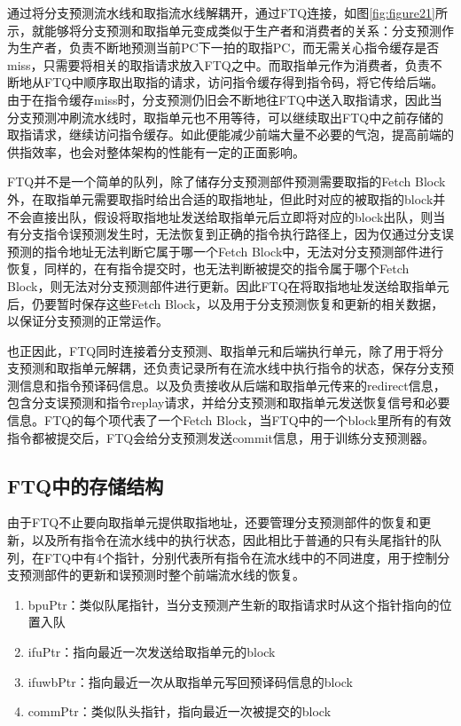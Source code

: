 通过将分支预测流水线和取指流水线解耦开，通过FTQ连接，如图\ref{fig:figure21}所示，就能够将分支预测和取指单元变成类似于生产者和消费者的关系：分支预测作为生产者，负责不断地预测当前PC下一拍的取指PC，而无需关心指令缓存是否miss，只需要将相关的取指请求放入FTQ之中。而取指单元作为消费者，负责不断地从FTQ中顺序取出取指的请求，访问指令缓存得到指令码，将它传给后端。由于在指令缓存miss时，分支预测仍旧会不断地往FTQ中送入取指请求，因此当分支预测冲刷流水线时，取指单元也不用等待，可以继续取出FTQ中之前存储的取指请求，继续访问指令缓存。如此便能减少前端大量不必要的气泡，提高前端的供指效率，也会对整体架构的性能有一定的正面影响。

FTQ并不是一个简单的队列，除了储存分支预测部件预测需要取指的Fetch Block外，在取指单元需要取指时给出合适的取指地址，但此时对应的被取指的block并不会直接出队，假设将取指地址发送给取指单元后立即将对应的block出队，则当有分支指令误预测发生时，无法恢复到正确的指令执行路径上，因为仅通过分支误预测的指令地址无法判断它属于哪一个Fetch Block中，无法对分支预测部件进行恢复，同样的，在有指令提交时，也无法判断被提交的指令属于哪个Fetch Block，则无法对分支预测部件进行更新。因此FTQ在将取指地址发送给取指单元后，仍要暂时保存这些Fetch Block，以及用于分支预测恢复和更新的相关数据，以保证分支预测的正常运作。

也正因此，FTQ同时连接着分支预测、取指单元和后端执行单元，除了用于将分支预测和取指单元解耦，还负责记录所有在流水线中执行指令的状态，保存分支预测信息和指令预译码信息。以及负责接收从后端和取指单元传来的redirect信息，包含分支误预测和指令replay请求，并给分支预测和取指单元发送恢复信号和必要信息。FTQ的每个项代表了一个Fetch Block，当FTQ中的一个block里所有的有效指令都被提交后，FTQ会给分支预测发送commit信息，用于训练分支预测器。

\subsection{FTQ中的存储结构}

由于FTQ不止要向取指单元提供取指地址，还要管理分支预测部件的恢复和更新，以及所有指令在流水线中的执行状态，因此相比于普通的只有头尾指针的队列，在FTQ中有4个指针，分别代表所有指令在流水线中的不同进度，用于控制分支预测部件的更新和误预测时整个前端流水线的恢复。

\begin{enumerate}
	\item bpuPtr：类似队尾指针，当分支预测产生新的取指请求时从这个指针指向的位置入队
	\item ifuPtr：指向最近一次发送给取指单元的block
	\item ifuwbPtr：指向最近一次从取指单元写回预译码信息的block
	\item commPtr：类似队头指针，指向最近一次被提交的block
\end{enumerate}

